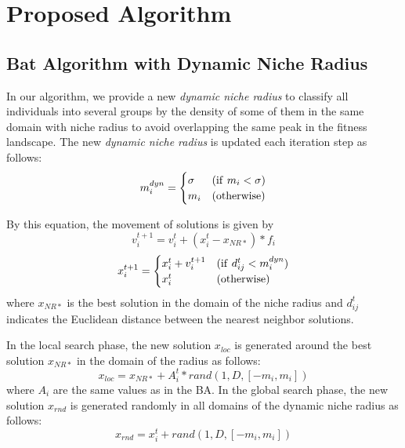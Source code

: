 \section{Proposed Algorithm}
\subsection{Bat Algorithm with Dynamic Niche Radius}
In our algorithm, we provide a new \textit{dynamic niche radius} to classify all individuals into several groups by the density of some of them in the same domain with niche radius to avoid overlapping the same peak in the fitness landscape. The new \textit{dynamic niche radius} is updated each iteration step as follows:
\begin{equation}
\label{eq:dnr}
m_i^{dyn}= \begin{cases}
\sigma & ({\rm if} \ m_{i} < \sigma) \\
m_i & ({\rm otherwise})
\end{cases}
\end{equation}

By this equation, the movement of solutions is given by
\begin{equation}
\label{eq:dnrvi}
v_i^{t+1}=v_i^t+(x_i^t-x_{NR*})*f_i
\end{equation}
\begin{equation}
\label{eq:dnrxi}
x_i^{t+1}= \begin{cases}
x_i^t+v_i^{t+1} & ({\rm if} \ d_{ij}^t < m_i^{dyn}) \\
x_i^t & ({\rm otherwise})
\end{cases}
\end{equation}
where $x_{NR*}$ is the best solution in the domain of the niche radius and $d_{ij}^t$ indicates the Euclidean distance between the nearest neighbor solutions. 

In the local search phase, the new solution $x_{loc}$ is generated around the best solution $x_{NR*}$ in the domain of the radius as follows:
\begin{equation}
\label{eq:dnrloc}
x_{loc}=x_{NR*} + A_i^t*rand(1,D,[-m_i, m_i])
\end{equation}
where $A_i$ are the same values as in the BA.
In the global search phase, the new solution $x_{rnd}$ is generated randomly in all domains of the dynamic niche radius as follows: 
\begin{equation}
\label{eq:dnrrnd}
x_{rnd}=x_i^t + rand(1,D,[-m_i, m_i])
\end{equation}

